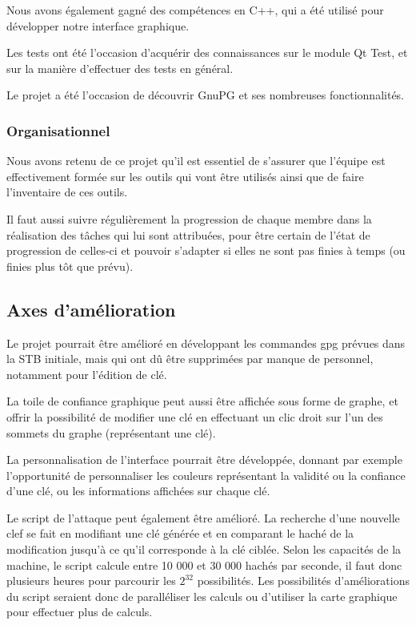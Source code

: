 \documentclass{../res/univ-projet}
\begin{document}
      Nous avons également gagné des compétences en C++, qui a été utilisé pour développer notre interface graphique.

      Les tests ont été l'occasion d'acquérir des connaissances sur le module Qt Test, et sur la manière d'effectuer des tests en général.

      Le projet a été l'occasion de découvrir GnuPG et ses nombreuses fonctionnalités.

    \subsubsection{Organisationnel}

      Nous avons retenu de ce projet qu'il est essentiel de s'assurer que l'équipe est effectivement formée sur les outils qui vont être utilisés ainsi que de faire l'inventaire de ces outils.
      
      Il faut aussi suivre régulièrement la progression de chaque membre dans la réalisation des tâches qui lui sont attribuées, pour être certain de l'état de progression de celles-ci et pouvoir s'adapter si elles ne sont pas finies à temps (ou finies plus tôt que prévu).




  \subsection{Axes d'amélioration}
  
    Le projet pourrait être amélioré en développant les commandes gpg prévues dans la STB initiale, mais qui ont dû être supprimées par manque de personnel, notamment pour l'édition de clé. 
    
    La toile de confiance graphique peut aussi être affichée sous forme de graphe, et offrir la possibilité de modifier une clé en effectuant un clic droit sur l'un des sommets du graphe (représentant une clé). 
    
    La personnalisation de l'interface pourrait être développée, donnant par exemple l'opportunité de personnaliser les couleurs représentant la validité ou la confiance d'une clé, ou les informations affichées sur chaque clé. 
    
    Le script de l'attaque peut également être amélioré. La recherche d'une nouvelle clef se fait en modifiant une clé générée et en comparant le haché de la modification jusqu'à ce qu'il corresponde à la clé ciblée. Selon les capacités de la machine, le script calcule entre 10 000 et 30 000 hachés par seconde, il faut donc plusieurs heures pour parcourir les $2^{32}$ possibilités. Les possibilités d'améliorations du script seraient donc de paralléliser les calculs ou d'utiliser la carte graphique pour effectuer plus de calculs.
\end{document}
